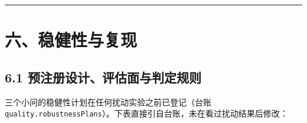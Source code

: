 \documentclass[
  11pt,
]{ctexart}
\begin{document}
\begin{center}\rule{0.5\linewidth}{0.5pt}\end{center}

\section{六、稳健性与复现}\label{ux516dux7a33ux5065ux6027ux4e0eux590dux73b0}

\subsection{6.1
预注册设计、评估面与判定规则}\label{ux9884ux6ce8ux518cux8bbeux8ba1ux8bc4ux4f30ux9762ux4e0eux5224ux5b9aux89c4ux5219}

三个小问的稳健性计划在任何扰动实验之前已登记（台账
\texttt{quality.\allowbreak{}robustnessPlans}）。下表直接引自台账，未在看过扰动结果后修改：
\end{document}
